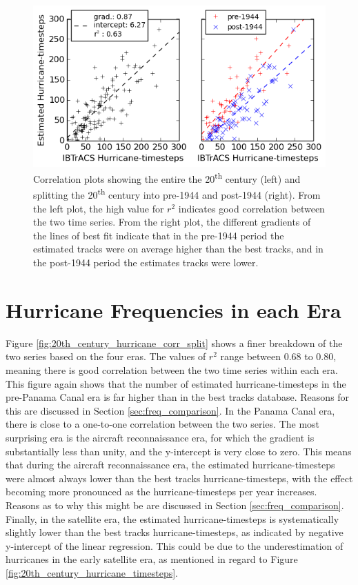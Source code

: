 \documentclass[pdftex,12pt,a4paper]{report}
\newcommand{\ts}{\textsuperscript}
\begin{document}
\begin{figure}[hb!]
    \centering
    \includegraphics[width=\textwidth]{figures/20th_century_corr}
    \caption{Correlation plots showing the entire the 20\ts{th} century (left) and splitting the
    20\ts{th} century into pre-1944 and post-1944 (right). From the left plot, the high value for
    $r^2$ indicates good correlation between the two time series. From the right plot, the different
    gradients of the lines of best fit indicate that in the pre-1944 period the estimated tracks
    were on average higher than the best tracks, and in the post-1944 period the estimates tracks were
    lower. }
    \label{fig:20th_century_hurricane_corr}
\end{figure}

\newpage
\section{Hurricane Frequencies in each Era}
\label{sec:hurr_freq_in_each_era}
Figure \ref{fig:20th_century_hurricane_corr_split} shows a finer breakdown of the two series based
on the four eras. The values of $r^2$ range between 0.68 to 0.80, meaning there is good correlation
between the two time series within each era. This figure again shows that the number of estimated
hurricane-timesteps in the pre-Panama Canal era is far higher than in the best tracks database.
Reasons for this are discussed in Section \ref{sec:freq_comparison}. In the Panama Canal era, there
is close to a one-to-one correlation between the two series. The most surprising era is the aircraft
reconnaissance era, for which the gradient is substantially less than unity, and the y-intercept is
very close to zero. This means that during the aircraft reconnaissance era, the estimated
hurricane-timesteps were almost always lower than the best tracks hurricane-timesteps, with the
effect becoming more pronounced as the hurricane-timesteps per year increases.  Reasons as to why
this might be are discussed in Section \ref{sec:freq_comparison}. Finally, in the satellite era, the
estimated hurricane-timesteps is systematically slightly lower than the best tracks
hurricane-timesteps, as indicated by negative y-intercept of the linear regression. This
could be due to the underestimation of hurricanes in the early satellite era, as mentioned in regard
to Figure \ref{fig:20th_century_hurricane_timesteps}.
\end{document}

